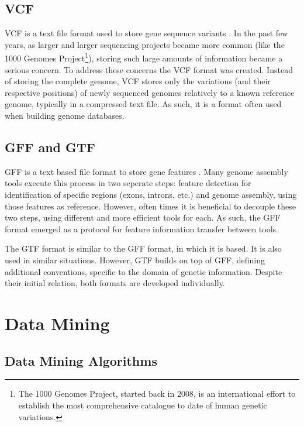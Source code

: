 \subsection{VCF}

VCF is a text file format used to store gene sequence variants \cite{smith13}.
In the past few years, as larger and larger \dna{} sequencing projects became
more common (like the 1000 Genomes Project\footnote{The 1000 Genomes Project,
started back in 2008, is an international effort to establish the most
comprehensive catalogue to date of human genetic variations.}), storing such
large amounts of information became a serious concern. To address these concerns
the VCF format was created. Instead of storing the complete genome, VCF stores
only the variations (and their respective positions) of newly sequenced genomes
relatively to a known reference genome, typically in a compressed text file. As
such, it is a format often used when building genome databases.

\subsection{GFF and GTF}

GFF is a text based file format to store gene features \cite{sanger11}. Many
genome assembly tools execute this process in two seperate steps: feature
detection for identification of specific regions (exons, introns, etc.) and
genome assembly, using those features as reference. However, often times it is
beneficial to decouple these two steps, using different and more efficient tools
for each. As such, the GFF format emerged as a protocol for feature information
transfer between tools.

The GTF format is similar to the GFF format, in which it is based. It is also
used in similar situations. However, GTF builds on top of GFF, defining
additional conventions, specific to the domain of genetic information. Despite
their initial relation, both formats are developed individually.

\section{Data Mining}\label{sec:mlearning}

\subsection{Data Mining Algorithms}\label{sec:minalgo}

